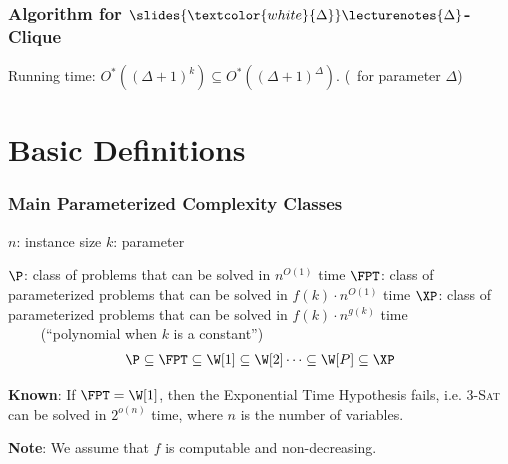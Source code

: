 \begin{frame}
 \frametitle{Algorithm for $\slides{\textcolor{white}{\Delta}}\lecturenotes{\Delta}$-Clique}

\begin{algorithm}[H]
\DontPrintSemicolon

\BlankLine
\end{algorithm}
\pause
 Running time: $O^*((\Delta+1)^k) \subseteq O^*((\Delta+1)^{\Delta})$. (\FPT\ for parameter $\Delta$)
\end{frame}

\section{Basic Definitions}


\begin{frame}
 \frametitle{Main Parameterized Complexity Classes}

 \noindent
 $n$: instance size\newline
 $k$: parameter
 
 \medskip
 \noindent
 $\P$: class of problems that can be solved in $n^{O(1)}$ time\newline
 $\FPT$: class of parameterized problems that can be solved in $f(k) \cdot n^{O(1)}$ time\newline
 $\XP$: class of parameterized problems that can be solved in $f(k) \cdot n^{g(k)}$ time\\ $\qquad$ (``polynomial when $k$ is a constant'')
 \begin{align*}
  \P \subseteq \FPT \subseteq \W[1] \subseteq \W[2] \dots \subseteq \W[P] \subseteq \XP
 \end{align*}

 \noindent
 \textbf{Known}: If $\FPT = \W[1]$, then the Exponential Time Hypothesis fails,
        i.e. 3-\textsc{Sat} can be solved in $2^{o(n)}$ time, where $n$ is the number of variables.
        
 \smallskip
 \noindent
 \textbf{Note}: We assume that $f$ is \alert{computable} and \alert{non-decreasing}.

\end{frame}


